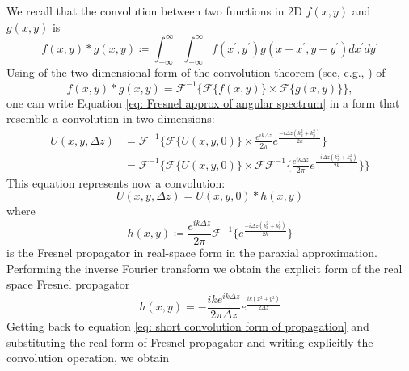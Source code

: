 \documentclass{iucr}              %
\newcommand{\ingreen}[1]{{\color{green}#1}}
\begin{document}
We recall that the convolution between two functions in 2D $f(x,y)$ and $g(x,y)$ is
\begin{equation}\label{eq: definition of convolution}
	f(x,y) * g(x,y) \coloneqq \int_{-\infty}^{\infty} \int_{-\infty}^{\infty} f(x^{\prime},y^{\prime})g(x-x^{\prime},y-y^{\prime})dx^{\prime}dy^{\prime}
\end{equation}
Using of the two-dimensional form of the convolution theorem (see, e.g., \cite{goodmanfourier}) of
\begin{equation}\label{eq: convolution theorem}
f(x,y) * g(x,y) = \mathcal{F}^{-1}\big\{{\mathcal{F}\{f(x,y)\} \times \mathcal{F}\{g(x,y)\}} \big\},
\end{equation}
one can write Equation \ref{eq: Fresnel approx of angular spectrum}  in a form that resemble a convolution in two dimensions:
\begin{align}\label{eq: convolution form of angular spectrum}
U(x, y, \Delta z) &= \mathcal{F}^{-1}\Big\{ \mathcal{F}\{U(x, y, 0)\} \times \frac{e^{i k \Delta z}}{2\pi} e^{\frac{-i \Delta z (k_x^2 + k_y^2) }{2k}} \Big\} \nonumber\\ 
&= \mathcal{F}^{-1}\Big\{ \mathcal{F}\{U(x, y, 0)\} \times \mathcal{F}\mathcal{F}^{-1}\Big\{  \frac{e^{i k \Delta z}}{2\pi} e^{\frac{-i \Delta z (k_x^2 + k_y^2) }{2k}} \Big \}\Big\}
\end{align} 
This equation represents now a convolution:
\begin{equation}\label{eq: short convolution form of propagation}
U(x, y, \Delta z) =U(x, y, 0) * h(x,y)
\end{equation} 
where 
\begin{equation}\label{eq: definition of Fresnel propagator}
h(x,y) \coloneqq \frac{e^{i k \Delta z}}{2\pi} \mathcal{F}^{-1}\Big \{e^{\frac{-i \Delta z (k_x^2 + k_y^2) }{2k}}\Big\}
\end{equation} 
is the Fresnel propagator in real-space form in the paraxial approximation. 
Performing the inverse Fourier transform 
we obtain the explicit form of the real space Fresnel propagator
\begin{equation}\label{eq: real space Fresnel propagator}
h(x,y) = -\frac{i k e^{i k\Delta z}}{2\pi \Delta z} e^{\frac{i k(x^2+y^2)}{2\Delta z}}
\end{equation}
Getting back to equation \ref{eq: short convolution form of propagation} and substituting the real form of Fresnel propagator and writing explicitly the convolution operation, we obtain
\end{document}

